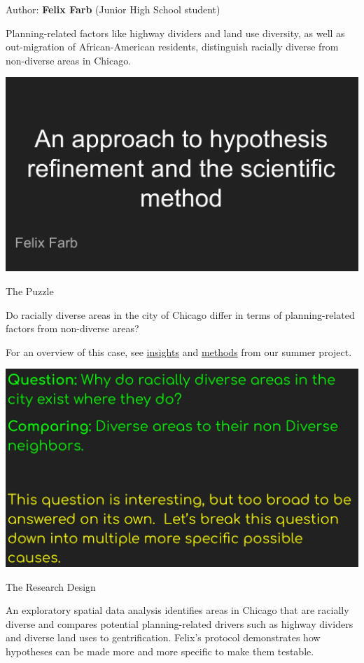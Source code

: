 \documentclass[
]{book}
\begin{document}
Author: \textbf{Felix Farb} (Junior High School student)

Planning-related factors like highway dividers and land use diversity, as well as out-migration of African-American residents, distinguish racially diverse from non-diverse areas in Chicago.

\includegraphics{images/racialdiversity1.png}

The Puzzle

Do racially diverse areas in the city of Chicago differ in terms of planning-related factors from non-diverse areas?

For an overview of this case, see \href{https://uchicago.box.com/s/pdku4e9rszvhtfnl1mv9o6sdv0ul1j3b}{insights} and \href{https://uchicago.box.com/s/rllzauyb3ew80htdq92i38o0re3q34v0}{methods} from our summer project.

\includegraphics{images/racialdiversity2.jpg}

The Research Design

An exploratory spatial data analysis identifies areas in Chicago that are racially diverse and compares potential planning-related drivers such as highway dividers and diverse land uses to gentrification. Felix's protocol demonstrates how hypotheses can be made more and more specific to make them testable.
\end{document}
